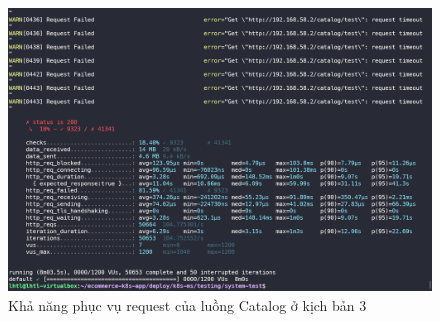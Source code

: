\begin{figure}[H]
  \begin{center}
      \includegraphics[scale = 0.25]{images/hanh/fullflow-test/full-flow-catalog-10-db-with-lb}
      \vspace*{1mm}
  \end{center}
  \caption{Khả năng phục vụ request của luồng Catalog ở kịch bản 3}
  \label{fig:fullflow-catalog-with-hpa-10-db}

\end{figure}

